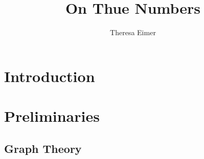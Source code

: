 \documentclass[12pt,a4paper]{article}
\author{Theresa Eimer}
\title{On Thue Numbers}
\date{}
\begin{document}
\renewcommand{\figurename}{Fig.}
\maketitle
\thispagestyle{empty}
\newpage
\tableofcontents
\thispagestyle{empty}
\newpage

\section{Introduction}
\section{Preliminaries}
\subsection{Graph Theory}
\end{document}
